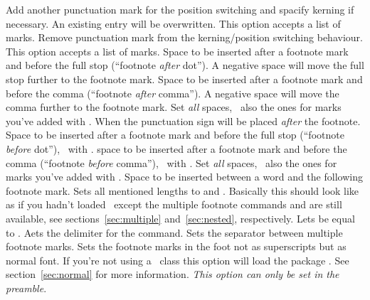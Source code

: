 \documentclass[load-preamble+]{cnltx-doc}
\begin{document}
\begin{options}
    Add another punctuation mark for the position switching and spacify
    kerning if necessary.  An existing entry will be overwritten.  This option
    accepts a list of marks.
    Remove punctuation mark from the kerning/position switching behaviour.
    This option accepts a list of marks.
  \Default{-.06em}
    Space to be inserted after a footnote mark and before the full stop
    (``footnote \emph{after} dot'').  A negative space will move the full stop
    further to the footnote mark.
  \Default{-.06em}
    Space to be inserted after a footnote mark and before the comma
    (``footnote \emph{after} comma'').  A negative space will move the comma
    further to the footnote mark.
    Set \emph{all} spaces, \ie\ also the ones for marks you've added with
    .
    When  the punctuation sign will be placed \emph{after} the
    footnote.
  \Default{-.16em}
    Space to be inserted after a footnote mark and before the full stop
    (``footnote \emph{before} dot''), \ie\ with .
  \Default{-.16em}
    space to be inserted after a footnote mark and before the comma
    (``footnote \emph{before} comma''), \ie\ with .
    Set \emph{all} spaces, \ie\ also the ones for marks you've added with
    .
  \Default{.06em}
    Space to be inserted between a word and the following footnote mark.
    Sets all mentioned lengths to \code{0pt} and .
    Basically this should look like as if you hadn't loaded \fnpct\ except the
    multiple footnote commands and  are still available, see
    sections~\ref{sec:multiple} and~\ref{sec:nested}, respectively.
    Lets  be equal to .
  \Default{;}
    Aets the delimiter for the  command.
  \Default{,}
    Sets the separator between multiple footnote marks.
  \label{opt:normal-marks}
    Sets the footnote marks in the foot not as superscripts but as normal
    font.  If you're not using a \KOMAScript\ class this option will load
    the package .  See section~\ref{sec:normal} for more
    information.  \emph{This option can only be set in the preamble}.
\end{options}
\end{document}
